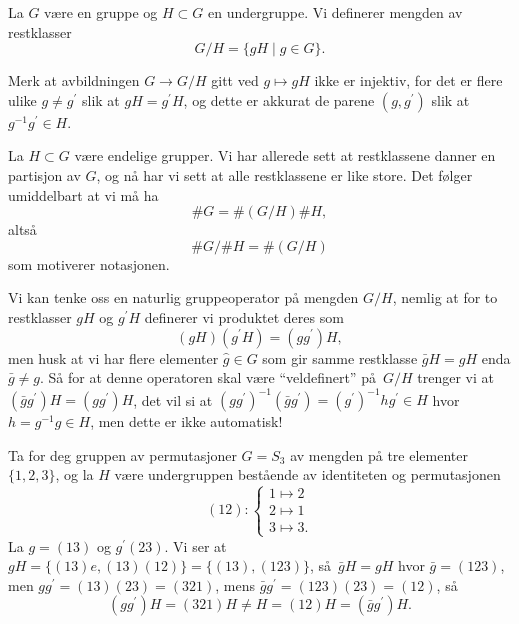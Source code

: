 \begin{definition}
    La $G$ være en gruppe og $H\subset G$ en undergruppe.
    Vi definerer mengden av restklasser
    \[
        G / H = \{ gH \mid g\in G\}.
    \]
\end{definition}

\begin{remark}
    Merk at avbildningen $G\to G / H$ gitt ved $g\mapsto gH$ ikke er injektiv,
    for det er flere ulike $g\neq g^\prime$ slik at $gH = g^\prime H$,
    og dette er akkurat de parene $(g, g^\prime)$ slik at $g^{-1}g^\prime\in H$.
\end{remark}

\begin{example}
    La $H\subset G$ være endelige grupper.
    Vi har allerede sett at restklassene danner en partisjon av $G$,
    og nå har vi sett at alle restklassene er like store.
    Det følger umiddelbart at vi må ha
    \[
        \# G = \# (G / H) \# H,
    \]
    altså
    \[
        \# G / \# H = \# (G / H)
    \]
    som motiverer notasjonen.
\end{example}

Vi kan tenke oss en naturlig gruppeoperator på mengden $G / H$,
nemlig at for to restklasser $gH$ og $g^\prime H$ definerer vi produktet deres som
\[
    (gH)(g^\prime H) = (gg^\prime)H,
\]
men husk at vi har flere elementer $\hat g\in G$ som gir samme restklasse
$\bar gH = gH$ enda $\bar g\neq g$.
Så for at denne operatoren skal være ``veldefinert'' på $G / H$ trenger
vi at $(\bar gg^\prime) H = (g g^\prime)H$,
det vil si at
${(g g^\prime)}^{-1} (\bar g g^\prime) = {(g^\prime)}^{-1} h g^\prime\in H$
hvor $h = g^{-1} g\in H$,
men dette er ikke automatisk!

\begin{example}
    Ta for deg gruppen av permutasjoner $G = S_3$ av mengden på tre elementer $\{1,2,3\}$,
    og la $H$ være undergruppen bestående av identiteten og permutasjonen
    \[
        (12)\colon \begin{cases}
            1\mapsto 2\\
            2\mapsto 1\\
            3\mapsto 3.
        \end{cases}
    \]
    La $g= (13)$ og $g^\prime (23)$.
    Vi ser at $gH = \{(13)e, (13)(12)\} = \{(13), (123)\}$,
    så $\bar gH = gH$ hvor $\bar g = (123)$,
    men $gg^\prime = (13)(23) = (321)$,
    mens $\bar g g^\prime = (123)(23) = (12)$,
    så
    \[
        (gg^\prime)H = (321)H\neq H = (12)H = (\bar g g^\prime)H.
    \]
\end{example}

